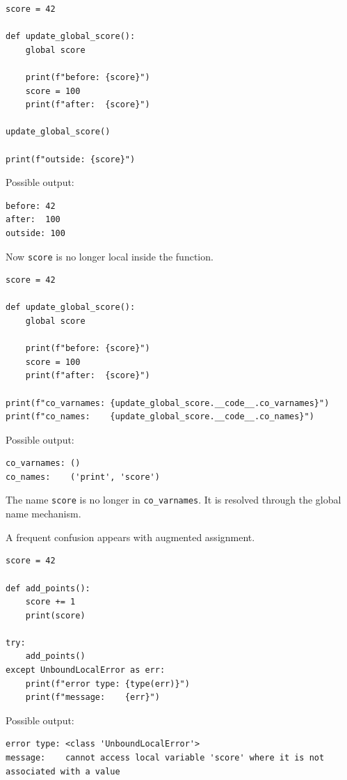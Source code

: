 \begin{verbatim}
score = 42

def update_global_score():
    global score

    print(f"before: {score}")
    score = 100
    print(f"after:  {score}")

update_global_score()

print(f"outside: {score}")
\end{verbatim}

Possible output:

\begin{verbatim}
before: 42
after:  100
outside: 100
\end{verbatim}

Now \texttt{score} is no longer local inside the function.

\begin{verbatim}
score = 42

def update_global_score():
    global score

    print(f"before: {score}")
    score = 100
    print(f"after:  {score}")

print(f"co_varnames: {update_global_score.__code__.co_varnames}")
print(f"co_names:    {update_global_score.__code__.co_names}")
\end{verbatim}

Possible output:

\begin{verbatim}
co_varnames: ()
co_names:    ('print', 'score')
\end{verbatim}

The name \texttt{score} is no longer in \texttt{co\_varnames}. It is resolved through the global name mechanism.

A frequent confusion appears with augmented assignment.

\begin{verbatim}
score = 42

def add_points():
    score += 1
    print(score)

try:
    add_points()
except UnboundLocalError as err:
    print(f"error type: {type(err)}")
    print(f"message:    {err}")
\end{verbatim}

Possible output:

\begin{verbatim}
error type: <class 'UnboundLocalError'>
message:    cannot access local variable 'score' where it is not associated with a value
\end{verbatim}

